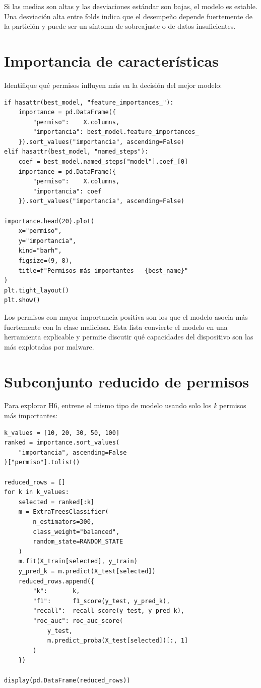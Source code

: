\documentclass[
  coursetitle={Cómputo Nube y Tecnologías Emergentes},
  coursehours={96},
  coursedate={Verano 2026},
  doctype={Tutorial},
  otherlangs={english,french},
  authorname={Lázaro},
  authorsurname={Bustio-Martínez},
  authortitle={PhD},
  role={Profesor Investigador},
  email={lbustio@inaoe.mx},
  phone={5559504000},
  ext={7459},
  institution={Instituto Nacional de Astrofísica, Óptica y Electrónica (INAOE)},
  department={Maestría en Ciencias en Tecnologías de Seguridad},
  address={Luis Enrique Erro 1, Sta. Ma. Tonantzintla, San Andrés Cholula, CP 72840, Puebla, México},
  margin={0.5in}
]{../../lbustio_lecture_notes}
\begin{document}
\begin{tcolorbox}[title=Interpretación]
Si las medias son altas y las desviaciones estándar son bajas, el modelo es estable. Una desviación alta entre folds indica que el desempeño depende fuertemente de la partición y puede ser un síntoma de sobreajuste o de datos insuficientes.
\end{tcolorbox}

\section{Importancia de características}

Identifique qué permisos influyen más en la decisión del mejor modelo:

\begin{lstlisting}
if hasattr(best_model, "feature_importances_"):
    importance = pd.DataFrame({
        "permiso":    X.columns,
        "importancia": best_model.feature_importances_
    }).sort_values("importancia", ascending=False)
elif hasattr(best_model, "named_steps"):
    coef = best_model.named_steps["model"].coef_[0]
    importance = pd.DataFrame({
        "permiso":    X.columns,
        "importancia": coef
    }).sort_values("importancia", ascending=False)

importance.head(20).plot(
    x="permiso",
    y="importancia",
    kind="barh",
    figsize=(9, 8),
    title=f"Permisos más importantes - {best_name}"
)
plt.tight_layout()
plt.show()
\end{lstlisting}

\begin{tcolorbox}[title=Interpretación]
Los permisos con mayor importancia positiva son los que el modelo asocia más fuertemente con la clase maliciosa. Esta lista convierte el modelo en una herramienta explicable y permite discutir qué capacidades del dispositivo son las más explotadas por malware.
\end{tcolorbox}

\section{Subconjunto reducido de permisos}

Para explorar H6, entrene el mismo tipo de modelo usando solo los \textit{k} permisos más importantes:

\begin{lstlisting}
k_values = [10, 20, 30, 50, 100]
ranked = importance.sort_values(
    "importancia", ascending=False
)["permiso"].tolist()

reduced_rows = []
for k in k_values:
    selected = ranked[:k]
    m = ExtraTreesClassifier(
        n_estimators=300,
        class_weight="balanced",
        random_state=RANDOM_STATE
    )
    m.fit(X_train[selected], y_train)
    y_pred_k = m.predict(X_test[selected])
    reduced_rows.append({
        "k":       k,
        "f1":      f1_score(y_test, y_pred_k),
        "recall":  recall_score(y_test, y_pred_k),
        "roc_auc": roc_auc_score(
            y_test,
            m.predict_proba(X_test[selected])[:, 1]
        )
    })

display(pd.DataFrame(reduced_rows))
\end{lstlisting}
\end{document}
